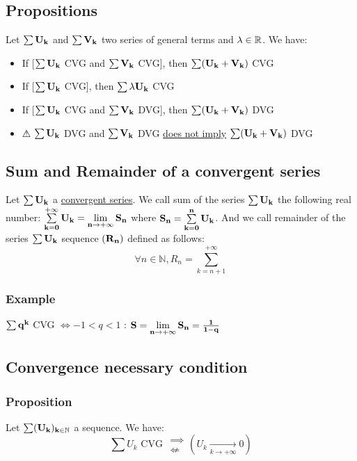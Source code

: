 \documentclass[notitlepage]{math}
\begin{document}
\subsection{Propositions}
Let $\bf \sum U_k$ and $\bf \sum V_k$ two series of general terms and $\bf \lambda \in \mathbb{R}$. We have:
\begin{itemize}
    \item If [$\bf \sum U_k$ CVG and $\bf \sum V_k$ CVG], then $\bf \sum (U_k + V_k)$ CVG
    \item If [$\bf \sum U_k$ CVG], then $\bf \sum \lambda U_k$ CVG
    \item If [$\bf \sum U_k$ CVG and $\bf \sum V_k$ DVG], then $\bf \sum (U_k + V_k)$ DVG
    \item ⚠ $\bf \sum U_k$ DVG and $\bf \sum V_k$ DVG \underline{does not imply} $\bf \sum (U_k + V_k)$ DVG
\end{itemize}

\subsection{Sum and Remainder of a convergent series}
Let $\bf \sum U_k$ a \underline{convergent series}. We call sum of the series $\bf \sum U_k$ 
the following real number: $\bf \sum\limits_{k=0}^{+\infty} U_k = \lim\limits_{n \to +\infty} S_n$ where $\bf {S_n} = \sum\limits_{k=0}^n U_k$.
And we call remainder of the series $\bf \sum U_k$ sequence $\bf (R_n)$ defined as follows:
\[ \forall n \in \mathbb{N}, R_n = \sum\limits_{k=n+1}^{+\infty}\]
\subsubsection{Example}
$\bf \sum q^k$ CVG $\Leftrightarrow \minus 1 < q < 1$ : $\bf S = \lim\limits_{n \to +\infty} S_n = \frac{1}{1 - q}$

\subsection{Convergence necessary condition}
\subsubsection{Proposition}
Let $\bf \sum (U_k)_{k \in \mathbb{N}}$ a sequence. We have:
\[ \sum U_k \text{ CVG } \begin{array}{ r }\implies \\ \not\Longleftarrow \end{array} \left( U_k \xrightarrow[k \to +\infty]{} 0 \right) \]
\end{document}
